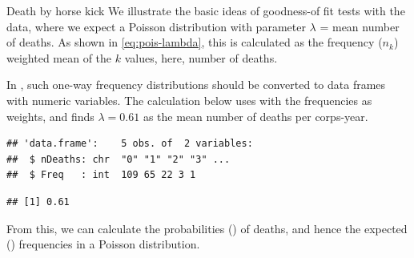 \documentclass[11pt]{book}
\renewenvironment{knitrout}{\small\renewcommand{\baselinestretch}{.85}}{} %
\begin{document}
\begin{Example}[horsekick3]{Death by horse kick}
We illustrate the basic ideas of goodness-of fit tests
with the  data, where we expect a Poisson
distribution with parameter $\lambda$ = mean number of
deaths. As shown in \eqref{eq:pois-lambda}, this is calculated
as the frequency ($n_k$) weighted mean of the $k$ values,
here, number of deaths.

In \R, such one-way frequency distributions should be converted
to data frames with numeric variables. The calculation below
uses  with the frequencies as weights,
and finds $\lambda = 0.61$ as the mean number of deaths per
corps-year.
\begin{knitrout}
\color{fgcolor}\begin{kframe}
\begin{alltt}
 \hlkwb{<-}  \hlstd{=}\hlstd{)}
 \hlkwb{<-} \hlstd{(}\hlstd{,} \hlstd{)}
\end{alltt}
\begin{verbatim}
## 'data.frame':	5 obs. of  2 variables:
##  $ nDeaths: chr  "0" "1" "2" "3" ...
##  $ Freq   : int  109 65 22 3 1
\end{verbatim}
\begin{alltt}
 \hlkwb{<-} \hlstd{(}\hlopt{$} \hlopt{$}
\end{alltt}
\begin{verbatim}
## [1] 0.61
\end{verbatim}
\end{kframe}
\end{knitrout}

From this, we can calculate the probabilities ()
of 
deaths, and hence the expected () frequencies in a
Poisson distribution.

\begin{knitrout}
\color{fgcolor}\begin{kframe}
\begin{alltt}
 \hlkwb{<-} \hlstd{(}\hlopt{:}\hlstd{,} 
 \hlkwb{<-} \hlstd{(tab[,}\hlstd{])} \hlopt{*} 
 \hlkwb{<-} \hlopt{$} \hlopt{-} \hlopt{^} \hlopt{/} 


\end{alltt}
\end{kframe}
\end{knitrout}
\end{Example}
\end{document}
